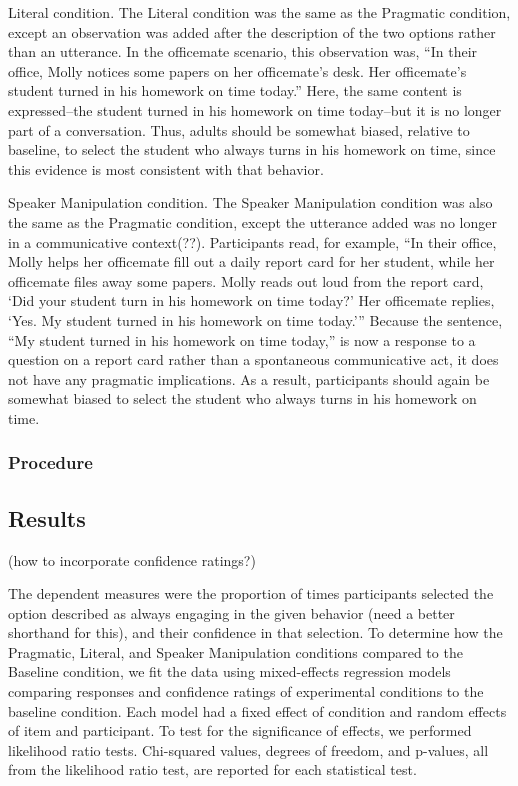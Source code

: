 \documentclass[10pt,letterpaper]{article}
\begin{document}
Literal condition. The Literal condition was the same as the Pragmatic condition, except an observation was added after the description of the two options rather than an utterance.  In the officemate scenario, this observation was, “In their office, Molly notices some papers on her officemate's desk. Her officemate's student turned in his homework on time today.”  Here, the same content is expressed--the student turned in his homework on time today--but it is no longer part of a conversation.  Thus, adults should be somewhat biased, relative to baseline, to select the student who always turns in his homework on time, since this evidence is most consistent with that behavior.

Speaker Manipulation condition.  The Speaker Manipulation condition was also the same as the Pragmatic condition, except the utterance added was no longer in a communicative context(??).  Participants read, for example, “In their office, Molly helps her officemate fill out a daily report card for her student, while her officemate files away some papers.  Molly reads out loud from the report card, ‘Did your student turn in his homework on time today?’  Her officemate replies, ‘Yes. My student turned in his homework on time today.’”  Because the sentence, “My student turned in his homework on time today,” is now a response to a question on a report card rather than a spontaneous communicative act, it does not have any pragmatic implications.  As a result, participants should again be somewhat biased to select the student who always turns in his homework on time.

\subsubsection{Procedure}

\subsection{Results}

(how to incorporate confidence ratings?)

The dependent measures were the proportion of times participants selected the option described as always engaging in the given behavior (need a better shorthand for this), and their confidence in that selection.  To determine how the Pragmatic, Literal, and Speaker Manipulation conditions compared to the Baseline condition, we fit the data using mixed-effects regression models comparing responses and confidence ratings of experimental conditions to the baseline condition.  Each model had a fixed effect of condition and random effects of item and participant.  To test for the significance of effects, we performed likelihood ratio tests. Chi-squared values, degrees of freedom, and p-values, all from the likelihood ratio test, are reported for each statistical test.
\end{document}
